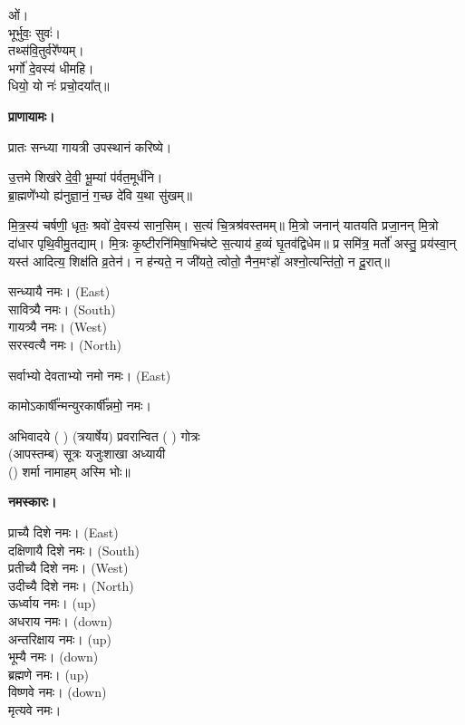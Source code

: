 ओं।\\
भूर्भुवः॒ सुवः॑।\\
तथ्स॑वि॒तुर्वरे᳚ण्यम्।\\
भर्गो॑ दे॒वस्य॑ धीमहि।\\
धियो॒ यो नः॑ प्रचो॒दया᳚त्॥

\textbf{प्राणायामः।}


प्रातः सन्ध्या गायत्री उपस्थानं करिष्ये।

उ॒त्तमे शिख॑रे दे॒वी॒ भू॒म्यां प॑र्वत॒मूर्ध॑नि।\\
ब्रा॒ह्मणे॑॑भ्यो ह्य॑नुज्ञा॒नं॒ ग॒च्छ दे॑वि य॒था सु॑खम्॥


मि॒त्र॒स्य॑ चर्\mbox{}षणी॒ धृतः॒ श्रवो॑ दे॒वस्य॑ सान॒सिम्। स॒त्यं चि॒त्रश्र॑वस्तमम्॥ मि॒त्रो जनान्॑ यातयति प्रजा॒नन् मि॒त्रो दा॑धार पृथि॒वीमु॒तद्याम्। मि॒त्रः कृ॒ष्टीरनि॑मिषा॒भिच॑ष्टे स॒त्याय॑ ह॒व्यं घृ॒तव॑द्विधेम॥ प्र समि॑त्र॒ मर्तो॑ अस्तु॒ प्रय॑स्वा॒न् यस्त॑ आदित्य॒ शिक्ष॑ति व्र॒तेन॑। न ह॑न्यते॒ न जी॑यते॒ त्वोतो॒ नैन॒मꣳहो॑ अश्नो॒त्यन्ति॑तो॒ न दू॒रात्॥



सन्ध्यायै नमः।  {\scriptsize (East)}\\
सावित्र्यै नमः। {\scriptsize (South)}\\
गायत्र्यै नमः।  {\scriptsize (West)}\\
सरस्वत्यै नमः।  {\scriptsize (North)}

सर्वाभ्यो देवताभ्यो नमो नमः। {\scriptsize (East)}

कामोऽकार्\mbox{}षी᳚न्मन्युरकार्\mbox{}षी᳚न्नमो॒ नमः।

अभिवादये ( ) (त्रयार्षेय) प्रवरान्वित ( ) गोत्रः\\
(आपस्तम्ब) सूत्रः यजुःशाखा अध्यायी\\
() शर्मा नामाहम् अस्मि भोः॥

\textbf{नमस्कारः।}


प्राच्यै दिशे नमः।   {\scriptsize (East)}\\
दक्षिणायै दिशे नमः।  {\scriptsize (South)}\\
प्रतीच्यै दिशे नमः।   {\scriptsize (West)}\\
उदीच्यै दिशे नमः।   {\scriptsize (North)}\\
ऊर्ध्वाय नमः।   {\scriptsize (up)}\\
अधराय नमः।   {\scriptsize (down)}\\
अन्तरिक्षाय नमः। {\scriptsize (up)}\\
भूम्यै नमः। {\scriptsize (down)}\\
ब्रह्मणे नमः। {\scriptsize (up)}\\
विष्णवे नमः।  {\scriptsize (down)}\\
मृत्यवे नमः।

